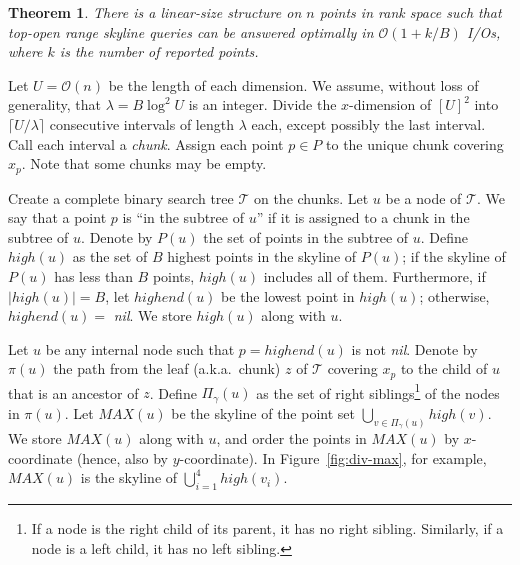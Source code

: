 \documentclass{sig-alternate}
\newtheorem{theorem}{Theorem}
\def\high{\mathit{high}}
\def\highend{\mathit{highend}}
\def\MAX{\mathit{MAX}}
\def\T{\mathcal{T}}
\newcommand{\bigO}{\mathcal{O}}
\newcommand{\nil}{\textit{nil}}
\renewcommand{\(}{\left(}
\renewcommand{\)}{\right)}
\begin{document}
\begin{theorem} \label{thm:div-rankmain}
  There is a linear-size structure on $n$ points in rank space such that
  top-open range skyline queries can be answered optimally in $\bigO(1 + k/B)$
  I/Os, where $k$ is the number of reported points.
\end{theorem}

\begin{fullenv}
 Let $U = \bigO(n)$ be the length of each dimension. We assume, without loss of generality, that 
$\lambda = B \log^2 U$ is an integer. Divide the $x$-dimension
of $[U]^2$ into $\lceil U/\lambda \rceil$ consecutive intervals of length $\lambda$ each, except possibly the last interval.
Call each interval a {\em chunk}. Assign each point $p \in P$ to the unique
chunk covering $x_p$. Note that some chunks may be empty.

Create a complete binary search tree $\T$ on the chunks. Let $u$ be a node of
$\T$. We say that a point $p$ is ``in the subtree of $u$'' if it is assigned to
a chunk in the subtree of $u$. Denote by $P(u)$ the set of points in the
subtree of $u$. Define $\high(u)$ as the set of $B$ highest points in the
skyline of $P(u)$; if the skyline of $P(u)$ has less than $B$ points,
$\high(u)$ includes all of them. Furthermore, if $|\high(u)| = B$, let
$\highend(u)$ be the lowest point in $\high(u)$; otherwise, $\highend(u) =$
\nil. We store $\high(u)$ along with $u$.

Let $u$ be any internal node such that $p = \highend(u)$ is not \nil. Denote by $\pi(u)$ the path from the leaf (a.k.a.\ chunk) $z$ of $\T$ covering $x_p$ to the child of $u$ that is an ancestor of $z$. Define $\Pi_\gamma(u)$ as the set of right siblings\footnote{If a node is the right child of its parent, it has no right sibling. Similarly, if a node is a left child, it has no left sibling.} of the nodes in $\pi(u)$. Let $\MAX(u)$ be the skyline of the point set $\bigcup_{v \in \Pi_\gamma(u)} \high(v).$ We store $\MAX(u)$ along with $u$, and order the points in $\MAX(u)$ by $x$-coordinate (hence, also by $y$-coordinate). In Figure~\ref{fig:div-max}, for example, $MAX(u)$ is the skyline of $\bigcup_{i=1}^4 \high(v_i)$.


\end{fullenv}
\end{document}
